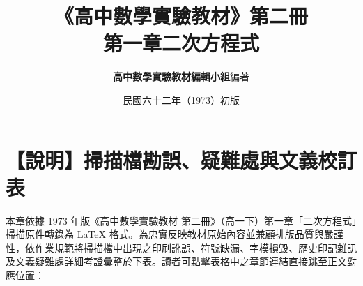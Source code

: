 \documentclass[a4paper,12pt,twoside]{article}
\title{\LARGE\textbf{《高中數學實驗教材》第二冊}\\[0.5em] \Large\textbf{第一章\quad 二次方程式}}
\author{\textbf{高中數學實驗教材編輯小組}\quad 編著}
\date{民國六十二年（1973）初版}
\begin{document}
\maketitle
\thispagestyle{firstpage}

\section*{【說明】掃描檔勘誤、疑難處與文義校訂表}
\label{sec:errata_notes}

本章依據 1973 年版《高中數學實驗教材 第二冊》（高一下）第一章「二次方程式」掃描原件轉錄為 \LaTeX{} 格式。為忠實反映教材原始內容並兼顧排版品質與嚴謹性，依作業規範將掃描檔中出現之印刷訛誤、符號缺漏、字模損毀、歷史印記雜訊及文義疑難處詳細考證彙整於下表。讀者可點擊表格中之章節連結直接跳至正文對應位置：
\end{document}
